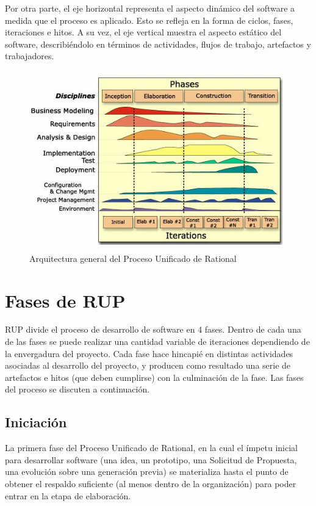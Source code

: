 Por otra parte, el eje horizontal representa el aspecto dinámico del software a medida que el proceso es aplicado. Esto se refleja en la forma de ciclos, fases, iteraciones e hitos. A su vez, el eje vertical muestra el aspecto estático del software, describiéndolo en términos de actividades, flujos de trabajo, artefactos y trabajadores.

\begin{figure}[hbt]
\begin{center}
\includegraphics[scale=0.75]{./imgs/rup_iteraciones}
\caption[Iteraciones de RUP]{Arquitectura general del Proceso Unificado de Rational \cite{rupKruchten}}
\label{fig:rup_iteraciones}
\end{center}
\end{figure}

\section{Fases de RUP}
RUP divide el proceso de desarrollo de software en 4 fases. Dentro de cada una de las fases se puede realizar una cantidad variable de iteraciones dependiendo de la envergadura del proyecto. Cada fase hace hincapié en distintas actividades asociadas al desarrollo del proyecto, y producen como resultado una serie de artefactos e hitos (que deben cumplirse) con la culminación de la fase. Las fases del proceso se discuten a continuación.

\subsection{Iniciación}
La primera fase del Proceso Unificado de Rational, en la cual el ímpetu inicial para desarrollar software (una idea, un prototipo, una Solicitud de Propuesta, una evolución sobre una generación previa) se materializa hasta el punto de obtener el respaldo suficiente (al menos dentro de la organización) para poder entrar en la etapa de elaboración.

